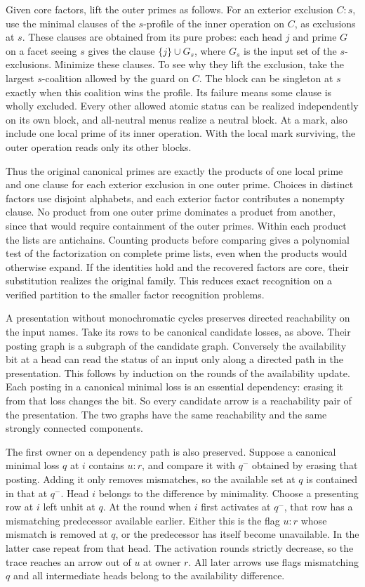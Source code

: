 Given core factors, lift the outer primes as follows.
For an exterior exclusion $C:s$, use the minimal
clauses of the $s$-profile of the inner operation on
$C$, as exclusions at $s$. These clauses are obtained
from its pure probes: each head $j$ and prime $G$ on
a facet seeing $s$ gives the clause $\{j\}\cup G_s$,
where $G_s$ is the input set of the $s$-exclusions.
Minimize these clauses. To see why they lift the
exclusion, take the largest $s$-coalition allowed by
the guard on $C$. The block can be singleton at $s$
exactly when this coalition wins the profile. Its
failure means some clause is wholly excluded. Every
other allowed atomic status can be realized independently
on its own block, and all-neutral menus realize a
neutral block. At a mark, also include one local prime
of its inner operation. With the local mark surviving,
the outer operation reads only its other blocks.

Thus the original canonical primes are exactly the
products of one local prime and one clause for each
exterior exclusion in one outer prime. Choices in
distinct factors use disjoint alphabets, and each
exterior factor contributes a nonempty clause. No
product from one outer prime dominates a product
from another, since that would require containment
of the outer primes. Within each product the lists
are antichains. Counting products before comparing
gives a polynomial test of the factorization on
complete prime lists, even when the products would
otherwise expand. If the identities hold and the
recovered factors are core, their substitution
realizes the original family. This reduces exact
recognition on a verified partition to the smaller
factor recognition problems.

A presentation without monochromatic cycles preserves
directed reachability on the input names. Take its rows to be canonical
candidate losses, as above. Their posting graph is a
subgraph of the candidate graph. Conversely the
availability bit at a head can read the status of an
input only along a directed path in the presentation.
This follows by induction on the rounds of the
availability update. Each posting in a canonical
minimal loss is an essential dependency: erasing it
from that loss changes the bit. So every candidate
arrow is a reachability pair of the presentation.
The two graphs have the same reachability and the
same strongly connected components.

The first owner on a dependency path is also preserved.
Suppose a canonical minimal loss $q$ at $i$ contains
$u:r$, and compare it with $q^-$ obtained by erasing
that posting. Adding it only removes mismatches, so
the available set at $q$ is contained in that at $q^-$.
Head $i$ belongs to the difference by minimality.
Choose a presenting row at $i$ left unhit at $q$.
At the round when $i$ first activates at $q^-$, that
row has a mismatching predecessor available earlier.
Either this is the flag $u:r$ whose mismatch is
removed at $q$, or the predecessor has itself become
unavailable. In the latter case repeat from that head.
The activation rounds strictly decrease, so the trace
reaches an arrow out of $u$ at owner $r$. All later
arrows use flags mismatching $q$ and all intermediate
heads belong to the availability difference.

